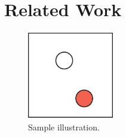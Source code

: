 \section{Related Work}


\begin{figure}[htb]
 \centering
 \includegraphics[width=1.5in]{sample}
 \caption{Sample illustration.}
\end{figure}